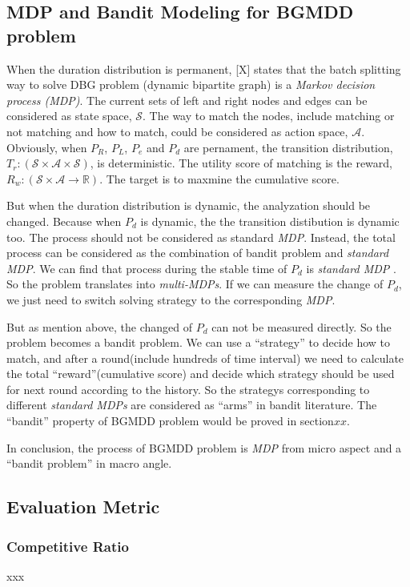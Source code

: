 \subsection{MDP and Bandit Modeling for BGMDD problem}
\par When the duration distribution is permanent, [X] states that the batch splitting way to solve DBG problem (dynamic bipartite graph) is a \emph{Markov decision process (MDP)}. The current sets of  left and right nodes and edges can be considered as state space, $\mathcal{S}$. The way to match the nodes, include matching or not matching and how to match, could be considered as action space, $\mathcal{A}$. Obviously, when $P_R$, $P_L$, $P_e$ and $P_d$ are pernament, the transition distribution, $T_r:(\mathcal{S} \times \mathcal{A} \times \mathcal{S})$, is deterministic. The  utility score of matching is the reward, $R_w:(\mathcal{S} \times \mathcal{A}\rightarrow \mathbb{R})$. The target is to maxmine the cumulative score.
\par But when the duration distribution is dynamic, the analyzation should be changed. Because when $P_d$ is dynamic, the the transition distibution is dynamic too. The process should not be considered as standard \emph{MDP}. Instead, the total process can be considered as the combination of bandit problem and  \emph{standard MDP}. We can find that process during the stable time of $P_d$ is \emph{standard MDP} . So the problem translates into \emph{multi-MDPs}. If we can measure the change of $P_d$, we just need to switch solving strategy to the corresponding \emph{MDP}. 
\par But as mention above, the changed of $P_d$ can not be measured directly. So the problem becomes a bandit problem. We can use a ``strategy'' to decide how to match, and after a round(include hundreds of time interval) we need to calculate the total ``reward''(cumulative score) and decide which strategy should be used for next round according to the history. So the strategys corresponding to different \emph{standard MDPs} are considered as ``arms'' in bandit literature. The ``bandit'' property of  BGMDD problem would be proved in section$xx$.
\par In conclusion, the process of BGMDD problem is \emph{MDP} from micro aspect and a ``bandit problem'' in macro angle.

\subsection{Evaluation Metric}
\subsubsection{Competitive Ratio}
xxx
